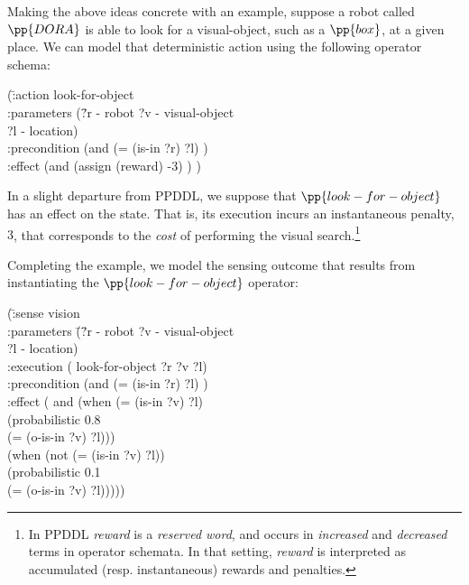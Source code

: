 
Making the above ideas concrete with an example, suppose a robot
called $\pp{DORA}$ is able to look for a visual-object, such as a
$\pp{box}$, at a given place. We can model that deterministic action
using the following operator schema:


\small
\begin{tabtt}
(\=:action look-for-object \+ \\
   :parameters (\=?r - robot ?v - visual-object\\
   \> ?l - location) \\
   :precondition (and (= (is-in ?r) ?l) ) \\
   :effect (and (assign (reward) -3) ) ) \\
\end{tabtt}
\normalsize


\noindent In a slight departure from PPDDL, we suppose that
$\pp{look-for-object}$ has an effect on the state. That is, its
execution incurs an instantaneous penalty, $3$, that corresponds to
the {\em cost} of performing the visual search.\footnote{In PPDDL {\em
reward} is a {\em reserved word}, and occurs in {\em increased} and
{\em decreased} terms in operator schemata. In that setting, {\em
reward} is interpreted as accumulated (resp. instantaneous) rewards
and penalties.}

Completing the example, we model the sensing outcome that results from
instantiating the $\pp{look-for-object}$ operator:

\small
\begin{tabtt}
(\= :sense vision \+\\
 :parameters \= (\= ?r - robot ?v - visual-object\\
 \>\>  ?l - location) \\
 :execution \> ( \> look-for-object ?r ?v ?l) \\
 :precondition (and (= (is-in ?r) ?l) ) \\
 :effect \>  (  \> and (when (= (is-in ?v) ?l) \\
   \> \> (probabilistic 0.8 \\
   \>  \>(= (o-is-in ?v) ?l))) \\
  \> (when (not (= (is-in ?v) ?l)) \\
   \>  \> (probabilistic 0.1 \\
   \>  \> (= (o-is-in ?v) ?l))))) \\
\end{tabtt}
\normalsize


